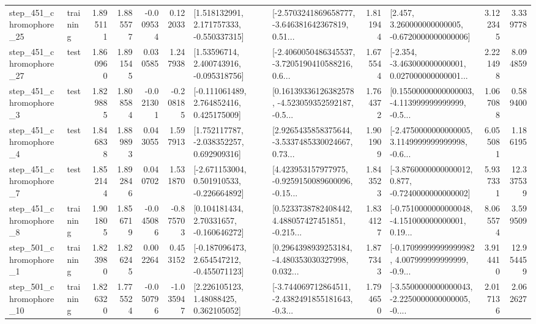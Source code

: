 \begin{tabular}{llrrrrllrlrr}
  step\_451\_chromophore\_25 &  training &      1.895111 &    1.885577 &     -0.009534 &  0.122033 &    [1.518132991, 2.171757333, -0.550337315] &  [-2.5703241869658777, -3.646381642367819, 0.51... &       1.811944 &    [2.457, 3.260000000000005, -0.6720000000000006] &            3.122345 &          3.339778 \\
  step\_451\_chromophore\_27 &      test &      1.860960 &    1.891545 &      0.030585 &  1.247938 &     [1.53596714, 2.400743916, -0.095318756] &  [-2.4060050486345537, -3.7205190410588216, 0.6... &       1.675544 &  [-2.354, -3.463000000000001, 0.027000000000001... &            2.221498 &          8.094859 \\
   step\_451\_chromophore\_3 &      test &      1.829885 &    1.808584 &     -0.021301 & -0.208185 &    [-0.111061489, 2.764852416, 0.425175009] &  [0.16139336126382578, -4.523059352592187, -0.5... &       1.764372 &  [0.15500000000000003, -4.113999999999999, -0.5... &            1.067088 &          0.589400 \\
   step\_451\_chromophore\_4 &      test &      1.846838 &    1.889893 &      0.043055 &  1.597913 &    [1.752117787, -2.038352257, 0.692909316] &  [2.9265435858375644, -3.5337485330024667, 0.73... &       1.901909 &  [-2.4750000000000005, 3.1149999999999998, -0.6... &            6.055081 &          1.186195 \\
   step\_451\_chromophore\_7 &      test &      1.852144 &    1.892846 &      0.040702 &  1.531870 &   [-2.671153004, 0.501910533, -0.226664892] &  [4.423953157977975, -0.9259150089600096, -0.15... &       1.843523 &  [-3.8760000000000012, 0.877, -0.7240000000000002] &            5.937331 &         12.337539 \\
   step\_451\_chromophore\_8 &  training &      1.901805 &    1.856719 &     -0.045086 & -0.875703 &     [0.104181434, 2.70331657, -0.160646272] &  [0.5233738782408442, 4.488057427451851, -0.215... &       1.834127 &  [-0.7510000000000048, -4.151000000000001, 0.19... &            8.065574 &          3.599509 \\
   step\_501\_chromophore\_1 &  training &      1.823980 &    1.826245 &      0.002264 &  0.453152 &   [-0.187096473, 2.654547212, -0.455071123] &  [0.2964398939253184, -4.480353030327998, 0.032... &       1.877343 &  [-0.17099999999999982, 4.007999999999999, -0.9... &            3.914410 &         12.954459 \\
  step\_501\_chromophore\_10 &  training &      1.826320 &    1.775524 &     -0.050796 & -1.035947 &      [2.226105123, 1.48088425, 0.362105052] &  [-3.744069712864511, -2.4382491855181643, -0.3... &       1.794650 &  [-3.5500000000000043, -2.2250000000000005, -0.... &            2.017136 &          2.062627 \\

\end{tabular}
